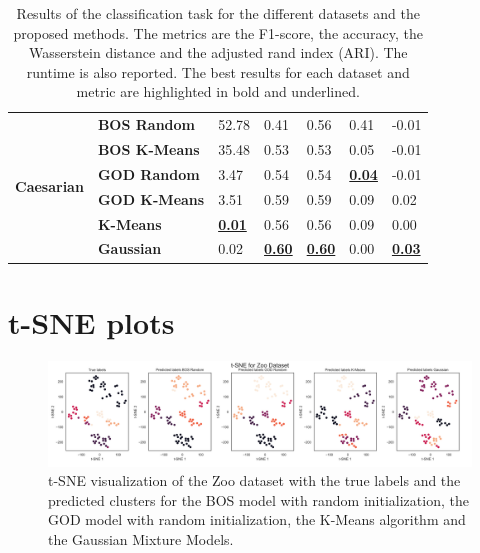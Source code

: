 \begin{table}
\begin{adjustbox}{width=\columnwidth}
\begin{tabular}{lllllll}
\cline{1-7}
\multirow[t]{6}{*}{\textbf{Caesarian}} & \textbf{BOS Random} & 52.78 & 0.41 & 0.56 & 0.41 & -0.01 \\
\textbf{} & \textbf{BOS K-Means} & 35.48 & 0.53 & 0.53 & 0.05 & -0.01 \\
\textbf{} & \textbf{GOD Random} & 3.47 & 0.54 & 0.54 & \textbf{\underline{0.04}} & -0.01 \\
\textbf{} & \textbf{GOD K-Means} & 3.51 & 0.59 & 0.59 & 0.09 & 0.02 \\
\textbf{} & \textbf{K-Means} & \textbf{\underline{0.01}} & 0.56 & 0.56 & 0.09 & 0.00 \\
\textbf{} & \textbf{Gaussian} & 0.02 & \textbf{\underline{0.60}} & \textbf{\underline{0.60}} & 0.00 & \textbf{\underline{0.03}} \\
\cline{1-7}
\bottomrule
\end{tabular}
\end{adjustbox}
\caption{
Results of the classification task for the different datasets and the proposed methods. 
The metrics are the F1-score, the accuracy, the Wasserstein distance and the adjusted rand index (ARI). 
The runtime is also reported. 
The best results for each dataset and metric are highlighted in bold and underlined. 
}
\label{tab:results_real}
\end{table}

\section{t-SNE plots}
\label{sec:appendix_tsne}
\begin{figure}[H]
    \centering
    \includegraphics[width=\textwidth]{Attachments/tsne_zoo.png}
    \caption{t-SNE visualization of the Zoo dataset with the true labels and the predicted clusters for the BOS model with random initialization, the GOD model with random initialization, the K-Means algorithm and the Gaussian Mixture Models.}
    \label{fig:tsne_zoo}
\end{figure}


